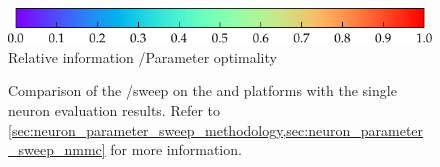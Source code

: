 \begin{figure}[t]
{		\hspace{4.1mm}%
		\label{fig:exp_stII}
	}%
	\hspace*{7mm}\includegraphics{media/chp5/colorbar_info.pdf}
	{\footnotesize Relative information \info/Parameter optimality \Pgen}
	\caption[Second NM-MC1 and NEST neuron parameter sweep]{Comparison of the \ETh/\wsyn sweep on the \NEST and \NMMC platforms with the single neuron evaluation results. Refer to \cref{sec:neuron_parameter_sweep_methodology,sec:neuron_parameter_sweep_nmmc} for more information.}
	\label{fig:exp_sweepII}
\end{figure}

